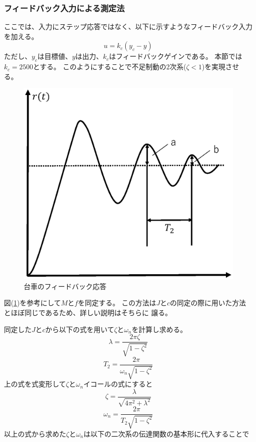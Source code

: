 	\subsubsection{フィードバック入力による測定法}
		ここでは、入力にステップ応答ではなく、以下に示すようなフィードバック入力を加える。
		\begin{equation}
			u = k_{c}(y_{c} - y)
		\end{equation}
		ただし、$y_c$は目標値、$y$は出力、$k_{c}$はフィードバックゲインである。
		本節では$k_c=2500$とする。
		このようにすることで不足制動の2次系($\zeta<1$)を実現させる。
		\begin{figure}[H]
			\centering
			\includegraphics[width=0.6\linewidth]{gazo/feedback.eps}
			\caption{台車のフィードバック応答}
			\label{image:parameterMFfeed}
		\end{figure}
		図(\ref{image:parameterMFfeed})を参考にして$M$と$f$を同定する。
		この方法は$J$と$c$の同定の際に用いた方法とほぼ同じであるため、詳しい説明はそちらに
		譲る。
		\par
		同定した$J$と$c$から以下の式を用いて$\zeta$と$\omega_{n}$を計算し求める。
		\begin{equation}
			\lambda=\frac{2\pi\zeta}{\sqrt{1-\zeta^{2}}}
		\end{equation}
		\begin{equation}
			T_{2}=\frac{2\pi}{\omega_{n}\sqrt{1-\zeta^{2}}}
		\end{equation}
		上の式を式変形して$\zeta$と$\omega_{n}$イコールの式にすると
		\begin{equation}
			\zeta=\frac{\lambda}{\sqrt{4\pi^{2}+\lambda^{2}}}
		\end{equation}
		\begin{equation}
			\omega_{n}=\frac{2\pi}{T_{2}\sqrt{1-\zeta^{2}}}
		\end{equation}
		以上の式から求めた$\zeta$と$\omega_{n}$は以下の二次系の伝達関数の基本形に代入することで
